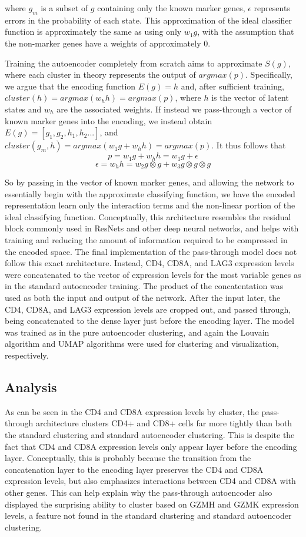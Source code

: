 \documentclass[journal]{IEEEtran}
\begin{document}
where $g_m$ is a subset of $g$ containing only the known marker genes, $\epsilon$ represents errors in the probability of each state. This approximation of the ideal classifier function is approximately the same as using only $w_1g$, with the assumption that the non-marker genes have a weights of approximately 0. 

Training the autoencoder completely from scratch aims to approximate $S(g)$, where each cluster in theory represents the output of $argmax(p)$. Specifically, we argue that the encoding function $E(g) = h$ and, after sufficient training, $cluster(h) = argmax(w_hh) = argmax(p)$, where $h$ is the vector of latent states and $w_h$ are the associated weights. If instead we pass-through a vector of known marker genes into the encoding, we instead obtain $E(g) = [g_1, g_2, h_1, h_2 ...]$, and $cluster(g_m, h) = argmax(w_1g + w_hh) = argmax(p)$. It thus follows that
$$
p = w_1g + w_hh = w_1g + \epsilon
$$
$$
\epsilon = w_hh = w_2 g\otimes g + w_3 g\otimes g\otimes g
$$

So by passing in the vector of known marker genes, and allowing the network to essentially begin with the approximate classifying function, we have the encoded representation learn only the interaction terms and the non-linear portion of the ideal classifying function. Conceptually, this architecture resembles the residual block commonly used in ResNets and other deep neural networks, and helps with training and reducing the amount of information required to be compressed in the encoded space. The final implementation of the pass-through model does not follow this exact architecture. Instead, CD4, CD8A, and LAG3 expression levels were concatenated to the vector of expression levels for the most variable genes as in the standard autoencoder training. The product of the concatentation was used as both the input and output of the network. After the input later, the CD4, CD8A, and LAG3 expression levels are cropped out, and passed through, being concatenated to the dense layer just before the encoding layer. The model was trained as in the pure autoencoder clustering, and again the Louvain algorithm and UMAP algorithms were used for clustering and visualization, respectively.


\subsection{Analysis}


As can be seen in the CD4 and CD8A expression levels by cluster, the pass-through architecture clusters CD4+ and CD8+ cells far more tightly than both the standard clustering and standard autoencoder clustering.
This is despite the fact that CD4 and CD8A expression levels only appear layer before the encoding layer. Conceptually, this is probably because the transition from the concatenation layer to the encoding layer preserves the CD4 and CD8A expression levels, but also emphasizes interactions between CD4 and CD8A with other genes. This can help explain why the pass-through autoencoder also displayed the surprising ability to cluster based on GZMH and GZMK expression levels, a feature not found in the standard clustering and standard autoencoder clustering.
\end{document}
